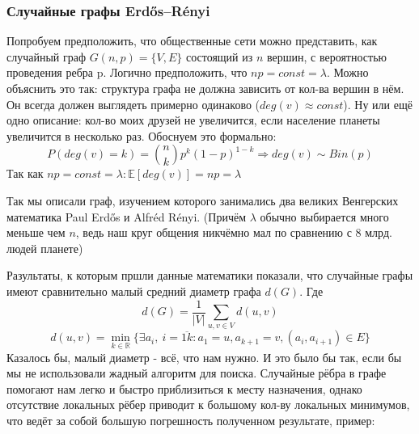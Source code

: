 \subsubsection{Случайные графы Erdős–Rényi}
Попробуем предположить, что общественные сети можно
представить, как случайный граф $G(n, p) = \{V, E\}$ состоящий из $n$ вершин, с
вероятностью проведения ребра p. Логично предположить, что $np = const = \lambda$.
Можно объяснить это так: структура графа не должна зависить от кол-ва
вершин в нём. Он всегда должен выглядеть примерно одинаково ($deg(v) \approx const$). Ну или ещё
одно описание: кол-во моих друзей не увеличится, если население планеты 
увеличится в несколько раз. Обоснуем это формально:
\begin{equation}
    P(deg(v) = k) = \binom{n}{k}p^k(1-p)^{1-k}
    \Rightarrow deg(v) \sim Bin(p)
\end{equation}
Так как $np = const = \lambda : \mathbb{E}[deg(v)] = np = \lambda$

Так мы описали граф, изучением которого занимались
два великих Венгерских математика Paul Erdős и Alfréd Rényi. (Причём $\lambda$ обычно
выбирается много меньше чем $n$, ведь наш круг общения никчёмно мал по сравнению с 8 млрд. людей
планете) 

Разультаты, к которым пршли данные математики показали, что случайные графы имеют 
сравнительно малый средний диаметр графа $d(G)$. Где
\begin{equation}
    d(G) = \frac{1}{|V|}\sum_{u, v \in V}d(u, v)
\end{equation}
\begin{equation}
    d(u, v) = \min_{k \in \mathbb{R}}\{\exists a_i, \ i = \overline{1k}  : a_1 = u, a_{k + 1} = v, (a_i, a_{i + 1}) \in E\}
\end{equation}
Казалось бы, малый диаметр - всё, что нам нужно. И это было бы так, если бы мы не 
использовали жадный алгоритм для поиска. Случайные рёбра в графе помогают 
нам легко и быстро приблизиться к месту назначения, однако отсутствие локальных
рёбер приводит к большому кол-ву локальных минимумов, что ведёт за собой большую
погрешность полученном результате, пример:

